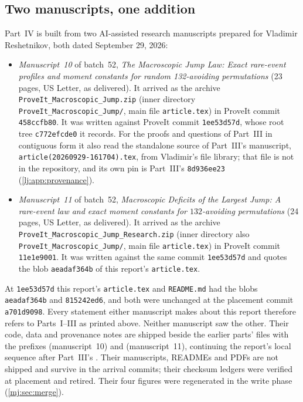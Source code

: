 \documentclass[11pt,a4paper]{article}
\theoremstyle{definition}\newaliascnt{definition}{theorem}
\theoremstyle{remark}\newaliascnt{remark}{theorem}
\begin{document}
\subsection{Two manuscripts, one addition}
\label{mj:sec:source}
Part~IV is built from two AI-assisted research manuscripts prepared for
Vladimir Reshetnikov, both dated September 29, 2026:
\begin{itemize}
\item \emph{Manuscript~10} of batch~52, \emph{The Macroscopic Jump Law:
 Exact rare-event profiles and moment constants for random 132-avoiding
 permutations} (23 pages, US Letter, as delivered). It arrived as the archive
 \texttt{ProveIt\_Macroscopic\_Jump.zip} (inner directory
 \texttt{ProveIt\_Macroscopic\_Jump/}, main file \texttt{article.tex}) in
 ProveIt commit \texttt{458ccfb80}. It was written against ProveIt commit
 \texttt{1ee53d57d}, whose root tree \texttt{c772efcde0} it records. For
 the proofs and questions of Part~III in contiguous form it also read the
 standalone source of Part~III's manuscript,
 \texttt{article(20260929-161704).tex}, from Vladimir's file library; that
 file is not in the repository, and its own pin is Part~III's
 \texttt{8d936ee23} (\cref{lj:app:provenance}).
\item \emph{Manuscript~11} of batch~52, \emph{Macroscopic Deficits of the
 Largest Jump: A rare-event law and exact moment constants for
 $132$-avoiding permutations} (24 pages, US Letter, as delivered). It
 arrived as the archive \texttt{ProveIt\_Macroscopic\_Jump\_Research.zip}
 (inner directory also \texttt{ProveIt\_Macroscopic\_Jump/}, main file
 \texttt{article.tex}) in ProveIt commit \texttt{11e1e9001}. It was written
 against the same commit \texttt{1ee53d57d} and quotes the blob
 \texttt{aeadaf364b} of this report's \texttt{article.tex}.
\end{itemize}
At \texttt{1ee53d57d} this report's \texttt{article.tex} and
\texttt{README.md} had the blobs \texttt{aeadaf364b} and
\texttt{815242ed6}, and both were unchanged at the placement commit
\texttt{a701d9098}. Every statement either manuscript makes about this report
therefore refers to Parts~I--III as printed above. Neither manuscript saw the
other. Their code, data and provenance notes are shipped beside the earlier
parts' files with the prefixes  (manuscript~10) and
 (manuscript~11), continuing the report's local
sequence after Part~III's . Their manuscripts, READMEs
and PDFs are not shipped and survive in the arrival commits; their checksum
ledgers were verified at placement and retired. Their four figures were
regenerated in the write phase (\cref{mj:sec:merge}).
\end{document}
